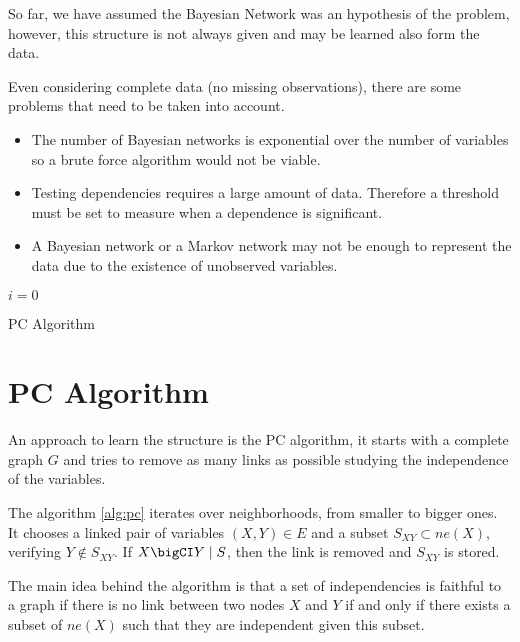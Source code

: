 
So far, we have assumed the Bayesian Network was an hypothesis of the problem, however, this structure is not always given and may be learned also form the data.

Even considering complete data (no missing observations), there are some problems that need to be taken into account.
\begin{itemize}
  \item The number of Bayesian networks is exponential over the number of
    variables so a brute force algorithm would not be viable.
  \item Testing dependencies requires a large amount of data. Therefore a threshold
    must be set to measure when a dependence is significant.
  \item A Bayesian network or a Markov network may not be enough to represent
    the data due to the existence of unobserved variables.
\end{itemize}


\begin{algorithm}[t]
  \SetAlgoLined
  \(i = 0\)\;
  \caption{PC Algorithm}\label{alg:pc}
\end{algorithm}

\section{PC Algorithm}

An approach to learn the structure is the PC algorithm, it starts with a
complete graph \(G\) and tries to remove as many links as possible studying the
independence of the variables.

The algorithm \ref{alg:pc} iterates over neighborhoods, from smaller to bigger ones. It chooses a linked pair of variables \((X,Y) \in E\) and
a subset \(S_{XY} \subset ne(X)\), verifying
\(Y \notin S_{XY}\). If \(X \bigCI Y \mid S\), then the link is removed and
\(S_{XY}\) is stored.

The main idea behind the algorithm is that a set of independencies is
faithful to a graph if there is no link between two nodes \(X\) and \(Y\) if
and only if there exists a subset of \(ne(X)\) such that they are independent
given this subset.

